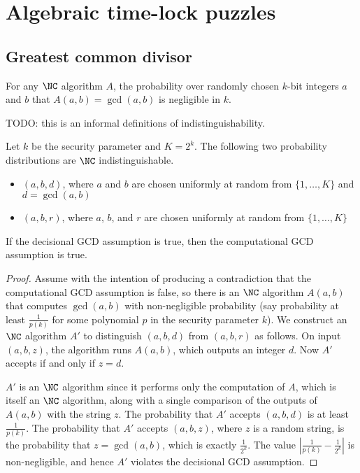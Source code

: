 \documentclass{article}
\begin{document}
\section{Algebraic time-lock puzzles}

\subsection{Greatest common divisor}

\begin{assumption}
  For any $\NC$ algorithm $A$, the probability over randomly chosen $k$-bit integers $a$ and $b$ that $A(a, b) = \gcd(a, b)$ is negligible in $k$.
\end{assumption}

\begin{assumption}
  TODO: this is an informal definitions of indistinguishability.

  Let $k$ be the security parameter and $K = 2^k$.
  The following two probability distributions are $\NC$ indistinguishable.
  \begin{itemize}
  \item $(a, b, d)$, where $a$ and $b$ are chosen uniformly at random from $\{1, \dotsc, K\}$ and $d = \gcd(a, b)$
  \item $(a, b, r)$, where $a$, $b$, and $r$ are chosen uniformly at random from $\{1, \dotsc, K\}$
  \end{itemize}
\end{assumption}

\begin{proposition}
  If the decisional GCD assumption is true, then the computational GCD assumption is true.
\end{proposition}
\begin{proof}
  Assume with the intention of producing a contradiction that the computational GCD assumption is false, so there is an $\NC$ algorithm $A(a, b)$ that computes $\gcd(a, b)$ with non-negligible probability (say probability at least $\frac{1}{p(k)}$ for some polynomial $p$ in the security parameter $k$).
  We construct an $\NC$ algorithm $A'$ to distinguish $(a, b, d)$ from $(a, b, r)$ as follows.
  On input $(a, b, z)$, the algorithm runs $A(a, b)$, which outputs an integer $d$.
  Now $A'$ accepts if and only if $z = d$.

  $A'$ is an $\NC$ algorithm since it performs only the computation of $A$, which is itself an $\NC$ algorithm, along with a single comparison of the outputs of $A(a, b)$ with the string $z$.
  The probability that $A'$ accepts $(a, b, d)$ is at least $\frac{1}{p(k)}$.
  The probability that $A'$ accepts $(a, b, z)$, where $z$ is a random string, is the probability that $z = \gcd(a, b)$, which is exactly $\frac{1}{2^k}$.
  The value $\left|\frac{1}{p(k)} - \frac{1}{2^k}\right|$ is non-negligible, and hence $A'$ violates the decisional GCD assumption.
\end{proof}
\end{document}
